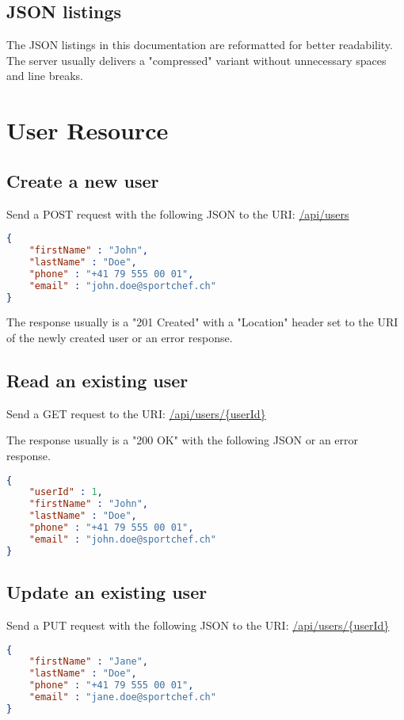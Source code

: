 \documentclass[a4paper,openright,twoside]{report}
\begin{document}
\subsection{JSON listings}
The JSON listings in this documentation are reformatted for better readability. The server usually delivers a "compressed" variant without unnecessary spaces and line breaks.

\section{User Resource}

\subsection{Create a new user}
Send a POST request with the following JSON to the URI: \url{/api/users}

\begin{lstlisting}[language=json]
{
	"firstName" : "John",
	"lastName" : "Doe",
	"phone" : "+41 79 555 00 01",
	"email" : "john.doe@sportchef.ch"
}
\end{lstlisting}

The response usually is a "201 Created" with a "Location" header set to the URI of the newly created user or an error response.

\subsection{Read an existing user}
Send a GET request to the URI: \url{/api/users/{userId}}

The response usually is a "200 OK" with the following JSON or an error response.

\begin{lstlisting}[language=json]
{
	"userId" : 1,
	"firstName" : "John",
	"lastName" : "Doe",
	"phone" : "+41 79 555 00 01",
	"email" : "john.doe@sportchef.ch"
}
\end{lstlisting}

\subsection{Update an existing user}
Send a PUT request with the following JSON to the URI: \url{/api/users/{userId}}

\begin{lstlisting}[language=json]
{
	"firstName" : "Jane",
	"lastName" : "Doe",
	"phone" : "+41 79 555 00 01",
	"email" : "jane.doe@sportchef.ch"
}
\end{lstlisting}
\end{document}
